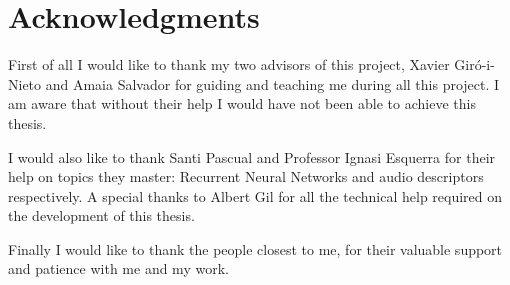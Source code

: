 \chapter*{Acknowledgments}

First of all I would like to thank my two advisors of this project, Xavier Giró-i-Nieto and Amaia Salvador for guiding and teaching me during all this project. I am aware that without their help I would have not been able to achieve this thesis.

I would also like to thank Santi Pascual and Professor Ignasi Esquerra for their help on topics they master: Recurrent Neural Networks and audio descriptors respectively. A special thanks to Albert Gil for all the technical help required on the development of this thesis.

Finally I would like to thank the people closest to me, for their valuable support and patience with me and my work.
